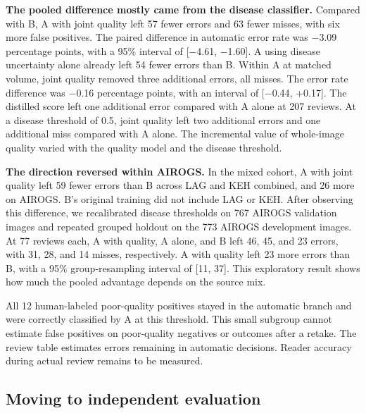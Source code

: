 \documentclass[
  10pt,
  letterpaper,
]{article}
\begin{document}
\textbf{The pooled difference mostly came from the disease classifier.}
Compared with B, A with joint quality left 57 fewer errors and 63 fewer
misses, with six more false positives. The paired difference in
automatic error rate was −3.09 percentage points, with a 95\% interval
of {[}−4.61, −1.60{]}. A using disease uncertainty alone already left 54
fewer errors than B. Within A at matched volume, joint quality removed
three additional errors, all misses. The error rate difference was −0.16
percentage points, with an interval of {[}−0.44, +0.17{]}. The distilled
score left one additional error compared with A alone at 207 reviews. At
a disease threshold of 0.5, joint quality left two additional errors and
one additional miss compared with A alone. The incremental value of
whole-image quality varied with the quality model and the disease
threshold.

\textbf{The direction reversed within AIROGS.} In the mixed cohort, A
with joint quality left 59 fewer errors than B across LAG and KEH
combined, and 26 more on AIROGS. B's original training did not include
LAG or KEH. After observing this difference, we recalibrated disease
thresholds on 767 AIROGS validation images and repeated grouped holdout
on the 773 AIROGS development images. At 77 reviews each, A with
quality, A alone, and B left 46, 45, and 23 errors, with 31, 28, and 14
misses, respectively. A with quality left 23 more errors than B, with a
95\% group-resampling interval of {[}11, 37{]}. This exploratory result
shows how much the pooled advantage depends on the source mix.

All 12 human-labeled poor-quality positives stayed in the automatic
branch and were correctly classified by A at this threshold. This small
subgroup cannot estimate false positives on poor-quality negatives or
outcomes after a retake. The review table estimates errors remaining in
automatic decisions. Reader accuracy during actual review remains to be
measured.

\subsection{Moving to independent
evaluation}\label{moving-to-independent-evaluation}
\end{document}
